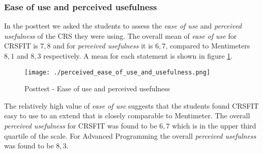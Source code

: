 

\subsubsection*{Ease of use and perceived usefulness}
In the posttest we asked the students to assess the \emph{ease of use} and \emph{perceived usefulness} of the CRS they were using. The overall mean of \emph{ease of use} for CRSFIT is $7,8$ and for \emph{perceived usefulness} it is $6,7$, compared to Mentimeters $8,1$ and $8,3$ respectively. A mean for each statement is shown in figure \ref{fig:perceived_ease_of_use_and_usefulness}.

 \begin{figure}[H]
  \centering
     \texttt{[image: ./perceived\_ease\_of\_use\_and\_usefulness.png]}
     \caption{Posttest - Ease of use and perceived usefulness}
     \label{fig:perceived_ease_of_use_and_usefulness}
 \end{figure}
 
The relatively high value of \emph{ease of use} suggests that the students found CRSFIT easy to use to an extend that is closely comparable to Mentimeter. The overall \emph{perceived usefulness} for CRSFIT was found to be $6,7$ which is in the upper third quartile of the scale. For Advanced Programming the overall \emph{perceived usefulness} was found to be $8,3$. 



